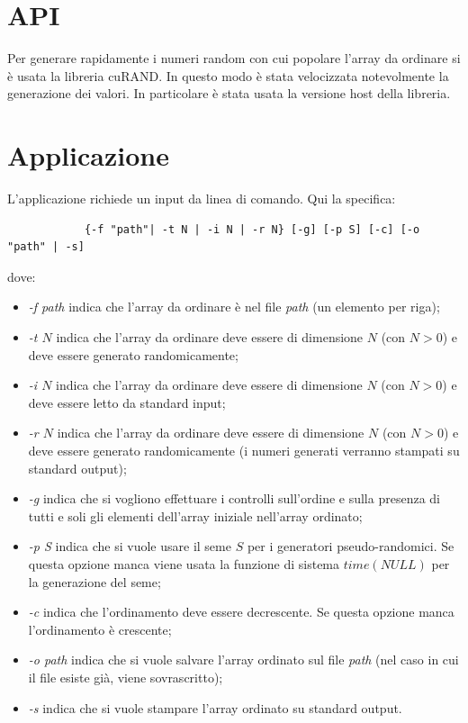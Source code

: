 \documentclass[a4paper, 11pt]{article}
\begin{document}
	\section{API}
		Per generare rapidamente i numeri random con cui popolare l'array da ordinare si è usata la libreria cuRAND. In questo modo è stata
		velocizzata notevolmente la generazione dei valori. 
		In particolare è stata usata la versione host della libreria.
	\section{Applicazione}
		L'applicazione richiede un input da linea di comando. Qui la specifica: 
		\begin{verbatim}
			{-f "path"| -t N | -i N | -r N} [-g] [-p S] [-c] [-o "path" | -s]
		\end{verbatim}
		dove:
		\begin{itemize}
			\item \emph{-f path} indica che l'array da ordinare è nel file \emph{path} (un elemento per riga);
			\item \emph{-t $N$} indica che l'array da ordinare deve essere di dimensione $N$ (con $N > 0$) e deve essere generato randomicamente;
			\item \emph{-i $N$} indica che l'array da ordinare deve essere di dimensione $N$ (con $N > 0$) e deve essere letto da standard input;
			\item \emph{-r $N$} indica che l'array da ordinare deve essere di dimensione $N$ (con $N > 0$) e deve essere generato randomicamente
			 	(i numeri generati verranno stampati su standard output);
			\item \emph{-g} indica che si vogliono effettuare i controlli sull'ordine e sulla presenza di tutti e soli gli elementi dell'array 
			iniziale nell'array ordinato;
			\item \emph{-p S} indica che si vuole usare il seme $S$ per i generatori pseudo-randomici. Se questa opzione manca viene
				usata la funzione di sistema $time(NULL)$ per la generazione del seme;
			\item \emph{-c} indica che l'ordinamento deve essere decrescente. Se questa opzione manca l'ordinamento è crescente;
			\item \emph{-o path} indica che si vuole salvare l'array ordinato sul file \emph{path} (nel caso in cui il file esiste già, viene 
				sovrascritto);
			\item \emph{-s} indica che si vuole stampare l'array ordinato su standard output.
		\end{itemize}
	
\end{document}
